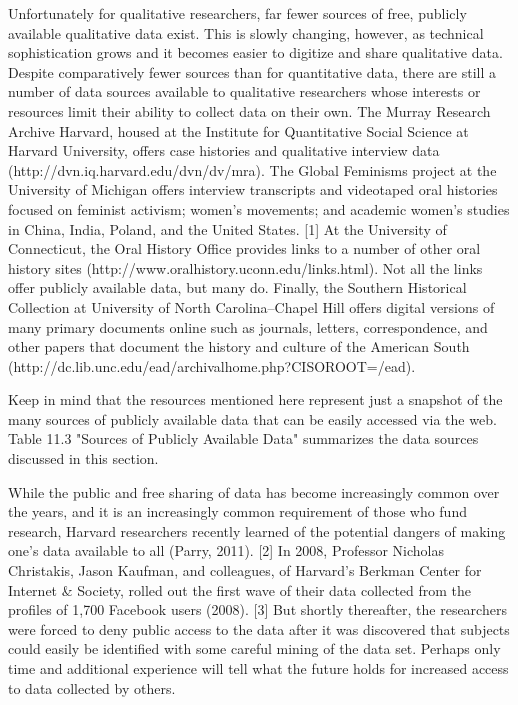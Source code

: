 Unfortunately for qualitative researchers, far fewer sources of free, publicly available qualitative data exist. This is slowly changing, however, as technical sophistication grows and it becomes easier to digitize and share qualitative data. Despite comparatively fewer sources than for quantitative data, there are still a number of data sources available to qualitative researchers whose interests or resources limit their ability to collect data on their own. The Murray Research Archive Harvard, housed at the Institute for Quantitative Social Science at Harvard University, offers case histories and qualitative interview data (http://dvn.iq.harvard.edu/dvn/dv/mra). The Global Feminisms project at the University of Michigan offers interview transcripts and videotaped oral histories focused on feminist activism; women's movements; and academic women's studies in China, India, Poland, and the United States. [1] At the University of Connecticut, the Oral History Office provides links to a number of other oral history sites (http://www.oralhistory.uconn.edu/links.html). Not all the links offer publicly available data, but many do. Finally, the Southern Historical Collection at University of North Carolina–Chapel Hill offers digital versions of many primary documents online such as journals, letters, correspondence, and other papers that document the history and culture of the American South (http://dc.lib.unc.edu/ead/archivalhome.php?CISOROOT=/ead).

Keep in mind that the resources mentioned here represent just a snapshot of the many sources of publicly available data that can be easily accessed via the web. Table 11.3 "Sources of Publicly Available Data" summarizes the data sources discussed in this section.


While the public and free sharing of data has become increasingly common over the years, and it is an increasingly common requirement of those who fund research, Harvard researchers recently learned of the potential dangers of making one's data available to all (Parry, 2011). [2] In 2008, Professor Nicholas Christakis, Jason Kaufman, and colleagues, of Harvard's Berkman Center for Internet \& Society, rolled out the first wave of their data collected from the profiles of 1,700 Facebook users (2008). [3] But shortly thereafter, the researchers were forced to deny public access to the data after it was discovered that subjects could easily be identified with some careful mining of the data set. Perhaps only time and additional experience will tell what the future holds for increased access to data collected by others.

